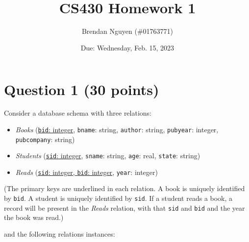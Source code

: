 \documentclass[letterpaper, 11pt]{article}
\title{CS430 Homework 1}
\author{Brendan Nguyen (\#01763771)}
\date{Due: Wednesday, Feb. 15, 2023}
\begin{document}
\maketitle

\section*{Question 1 (30 points)}

Consider a database schema with three relations:
\begin{itemize}
    \item \textit{Books} (\underline{\texttt{bid}: integer}, \texttt{bname}: string, \texttt{author}: string, \texttt{pubyear}: integer, \texttt{pubcompany}: string)
    \item \textit{Students} (\underline{\texttt{sid}: integer}, \texttt{sname}: string, \texttt{age}: real, \texttt{state}: string)
    \item \textit{Reads} (\underline{\texttt{sid}: integer, \texttt{bid}: integer}, \texttt{year}: integer)
\end{itemize}

(The primary keys are underlined in each relation. A book is uniquely identified by \texttt{bid}. A student is uniquely identified by \texttt{sid}. If a student reads a book, a record will be present in the \textit{Reads} relation, with that \texttt{sid} and \texttt{bid} and the year the book was read.)

and the following relations instances:
\end{document}
